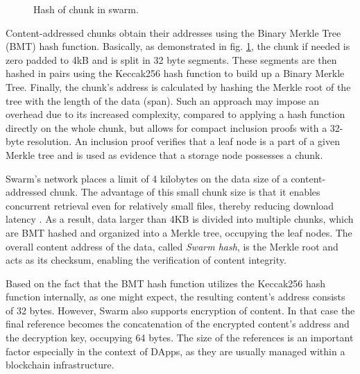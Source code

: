 \begin{figure}[htbp]
    \centering
    \resizebox{1\textwidth}{!}{
    }
    \caption{Hash of chunk in swarm. \citep{tron_2020}}
    \label{fig:bmt}
 \end{figure}

Content-addressed chunks obtain their addresses using the Binary Merkle Tree (BMT) hash function. Basically, as demonstrated in fig. \ref{fig:bmt}, the chunk if needed is zero padded to 4kB and is split in 32 byte segments. These segments are then hashed in pairs using the Keccak256 hash function to build up a Binary Merkle Tree. Finally, the chunk's address is calculated by hashing the Merkle root of the tree with the length of the data (span). Such an approach may impose an overhead due to its increased complexity, compared to applying a hash function directly on the whole chunk, but allows for compact inclusion proofs with a 32-byte resolution. An inclusion proof verifies that a leaf node is a part of a given Merkle tree \citep{wikipedia_2023} and is used as evidence that a storage node possesses a chunk.

Swarm's network places a limit of 4 kilobytes on the data size of a content-addressed chunk. The advantage of this small chunk size is that it enables concurrent retrieval even for relatively small files, thereby reducing download latency \citep[p.~38]{tron_2020}. As a result, data larger than 4KB is divided into multiple chunks, which are BMT hashed and organized into a Merkle tree, occupying the leaf nodes. The overall content address of the data, called \textit{Swarm hash}, is the Merkle root and acts as its checksum, enabling the verification of content integrity.

Based on the fact that the BMT hash function utilizes the Keccak256 hash function internally, as one might expect, the resulting content's address consists of 32 bytes. However, Swarm also supports encryption of content. In that case the final reference becomes the concatenation of the encrypted content's address and the decryption key, occupying 64 bytes. The size of the references is an important factor especially in the context of DApps, as they are usually managed within a blockchain infrastructure.

